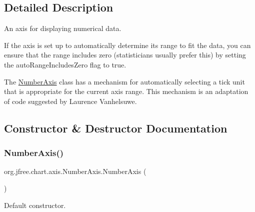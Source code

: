 \subsection{Detailed Description}
An axis for displaying numerical data. 

If the axis is set up to automatically determine its range to fit the data, you can ensure that the range includes zero (statisticians usually prefer this) by setting the {\ttfamily auto\+Range\+Includes\+Zero} flag to {\ttfamily true}. 

The {\ttfamily \mbox{\hyperlink{classorg_1_1jfree_1_1chart_1_1axis_1_1_number_axis}{Number\+Axis}}} class has a mechanism for automatically selecting a tick unit that is appropriate for the current axis range. This mechanism is an adaptation of code suggested by Laurence Vanhelsuwe. 

\subsection{Constructor \& Destructor Documentation}
\mbox{\label{classorg_1_1jfree_1_1chart_1_1axis_1_1_number_axis_a1c4bca834e0f0bf26802bd88690fca17}} 
\subsubsection{\texorpdfstring{Number\+Axis()}{NumberAxis()}\hspace{0.1cm}{\footnotesize\ttfamily [1/2]}}
{\footnotesize\ttfamily org.\+jfree.\+chart.\+axis.\+Number\+Axis.\+Number\+Axis (\begin{DoxyParamCaption}{ }\end{DoxyParamCaption})}

Default constructor. \mbox{\label{classorg_1_1jfree_1_1chart_1_1axis_1_1_number_axis_a318db4480cecc7359647e2978dbadc9d}} 
